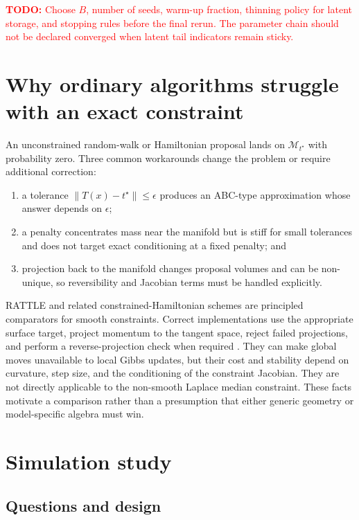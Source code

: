\documentclass[smallextended,natbib,runningheads]{svjour3}
\newcommand{\todo}[1]{\textcolor{red}{\textbf{TODO:} #1}}
\begin{document}
\todo{Choose $B$, number of seeds, warm-up fraction, thinning policy for latent
storage, and stopping rules before the final rerun.  The parameter chain should
not be declared converged when latent tail indicators remain sticky.}

\section{Why ordinary algorithms struggle with an exact constraint}
\label{sec:comparators}

An unconstrained random-walk or Hamiltonian proposal lands on
$\mathcal M_{t^\star}$ with probability zero.  Three common workarounds change
the problem or require additional correction:
\begin{enumerate}
  \item a tolerance $\|T(x)-t^\star\|\leq\epsilon$ produces an ABC-type
  approximation whose answer depends on $\epsilon$;
  \item a penalty concentrates mass near the manifold but is stiff for small
  tolerances and does not target exact conditioning at a fixed penalty; and
  \item projection back to the manifold changes proposal volumes and can be
  non-unique, so reversibility and Jacobian terms must be handled explicitly.
\end{enumerate}

RATTLE and related constrained-Hamiltonian schemes are principled comparators
for smooth constraints.  Correct implementations use the appropriate surface
target, project momentum to the tangent space, reject failed projections, and
perform a reverse-projection check when required \citep{lelievre2019}.  They
can make global moves unavailable to local Gibbs updates, but their cost and
stability depend on curvature, step size, and the conditioning of the
constraint Jacobian.  They are not directly applicable to the non-smooth
Laplace median constraint.  These facts motivate a comparison rather than a
presumption that either generic geometry or model-specific algebra must win.

\section{Simulation study}
\label{sec:simulation}

\subsection{Questions and design}
\end{document}
